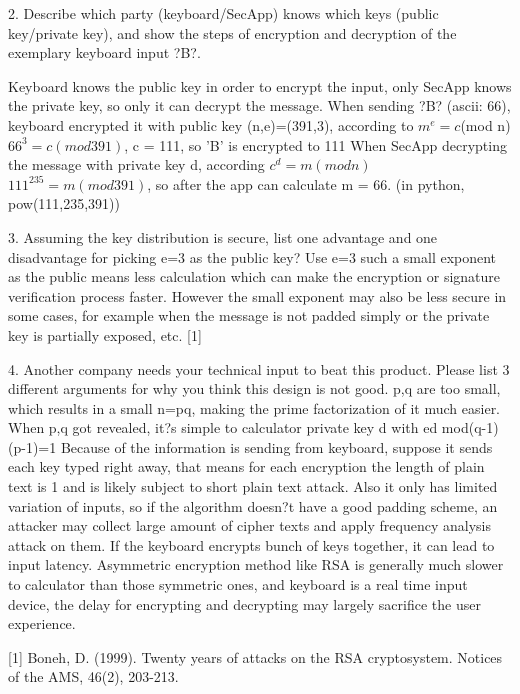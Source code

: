\documentclass[12pt]{article}  %
\begin{document}
2. Describe which party (keyboard/SecApp) knows which keys (public key/private key), and show the steps of encryption and decryption of the exemplary keyboard input ?B?.

     Keyboard knows the public key in order to encrypt the input, only SecApp knows the private key, so only it can decrypt the message. 
     When sending ?B? (ascii: 66), keyboard encrypted it with public key (n,e)=(391,3), according to \(m^e = c\)(mod n)
          \(66^3 = c (mod 391)\), c = 111, so 'B' is encrypted to 111
     When SecApp decrypting the message with private key d, according \(c^d = m (mod n)\)
          \(111^235 = m (mod 391)\), so after the app can calculate m = 66. (in python, pow(111,235,391))

3. Assuming the key distribution is secure, list one advantage and one disadvantage for picking e=3 as the public key?
     Use e=3 such a small exponent as the public means less calculation which can make the encryption or signature verification process faster. However the small exponent may also be less secure in some cases, for example when the message is not padded simply or the private key is partially exposed, etc. [1]

4. Another company needs your technical input to beat this product. Please list 3 different arguments for why you think this design is not good.
p,q are too small, which results in a small n=pq, making the prime factorization of it much easier. When p,q got revealed, it?s simple to calculator private key d with ed mod(q-1)(p-1)=1
Because of the information is sending from keyboard, suppose it sends each key typed right away, that means for each encryption the length of plain text is 1 and is likely subject to short plain text attack. Also it only has limited variation of inputs, so if the algorithm doesn?t have a good padding scheme, an attacker may collect large amount of cipher texts and apply frequency analysis attack on them. If the keyboard encrypts bunch of keys together, it can lead to input latency.
Asymmetric encryption method like RSA is generally much slower to calculator than those symmetric ones, and keyboard is a real time input device, the delay for encrypting and decrypting may largely sacrifice the user experience.

[1] Boneh, D. (1999). Twenty years of attacks on the RSA cryptosystem. Notices of the AMS, 46(2), 203-213.
\end{document}
